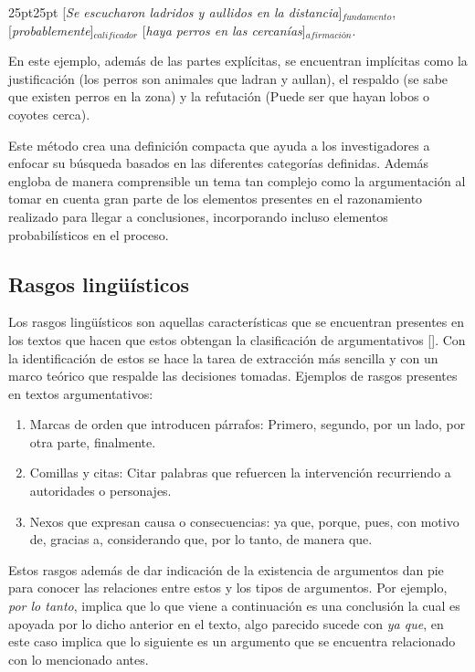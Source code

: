 \begin{adjustwidth}{25pt}{25pt}
    [\emph{Se escucharon ladridos y aullidos en la distancia}]$_{fundamento}$, 
    [\emph{probablemente}]$_{calificador}$ 
    [\emph{haya perros en las cercanías}]$_{afirmación}$.
\end{adjustwidth}

En este ejemplo, además de las partes explícitas, se encuentran implícitas como la justificación 
(los perros son animales que ladran y aullan), el respaldo (se sabe que existen perros en la zona) y 
la refutación (Puede ser que hayan lobos o coyotes cerca).

Este método crea una definición compacta que ayuda a los investigadores a enfocar su búsqueda basados
en las diferentes categorías definidas. Además engloba de manera comprensible un tema tan complejo 
como la argumentación al tomar en cuenta gran parte de los elementos presentes en el razonamiento
realizado para llegar a conclusiones, incorporando incluso elementos probabilísticos en el proceso. 

\subsection{Rasgos lingüísticos}

Los rasgos lingüísticos son aquellas características que se encuentran presentes en los textos 
que hacen que estos obtengan la clasificación de argumentativos [\cite{venegas2005hacia}]. Con 
la identificación de estos se hace la tarea de extracción más sencilla y con un marco teórico 
que respalde las decisiones tomadas. Ejemplos de rasgos presentes en textos argumentativos:

\begin{enumerate}
    \item Marcas de orden que introducen párrafos: Primero, segundo, por un lado, por otra parte,
    finalmente.
    \item Comillas y citas: Citar palabras que refuercen la intervención recurriendo a autoridades
    o personajes.
    \item Nexos que expresan causa o consecuencias: ya que, porque, pues, con motivo de, gracias a,
    considerando que, por lo tanto, de manera que.
\end{enumerate}

Estos rasgos además de dar indicación de la existencia de argumentos dan pie para conocer las relaciones
entre estos y los tipos de argumentos. Por ejemplo, \emph{por lo tanto}, implica que lo que viene 
a continuación es una conclusión la cual es apoyada por lo dicho anterior en el texto, algo parecido
sucede con \emph{ya que}, en este caso implica que lo siguiente es un argumento que se encuentra 
relacionado con lo mencionado antes.

